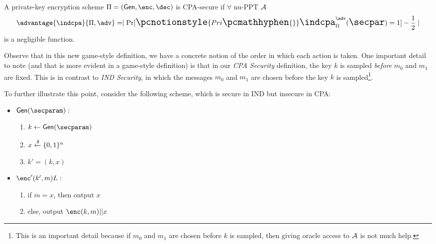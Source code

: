 \begin{definition}
    A private-key encryption scheme $\Pi = (\gen,\enc,\dec)$ is CPA-secure if $\forall$ nu-PPT $\mathcal{A}$
    $$\advantage{\indcpa}{\Pi,\adv} = \Large\mid \Pr[\pcnotionstyle{Pri\pcmathhyphen{}}\indcpa_\Pi^\adv(\secpar) =1] -\frac12\Large\mid$$
    is a negligible function.
\end{definition}
Observe that in this new game-style definition, we have a concrete notion of the order in which each action is taken.
One important detail to note (and that is more evident in a game-style definition) is that in our \textit{CPA Security} definition,
the key $k$ is sampled \textit{before} $m_0$ and $m_1$ are fixed.
This is in contrast to \textit{IND Security}, in which the messages $m_0$ and $m_1$ are chosen before the key $k$ is sampled\footnote{This is an important detail because if $m_0$ and $m_1$ are chosen before $k$ is sampled, then giving oracle access to $\mathcal{A}$ is not much help.}.

To further illustrate this point, consider the following scheme, which is secure in IND but insecure in CPA:
\begin{itemize}
    \item $\gen(\secparam):$
    \begin{enumerate}
        \item $k \leftarrow \gen(\secparam)$
        \item $x \xleftarrow{\$} \{0, 1\}^n$
        \item $k' = (k, x)$
    \end{enumerate}
    \item $\enc'(k', m)L:$
    \begin{enumerate}
        \item if $m = x$, then output $x$
        \item else, output $\enc(k,m)||x$
    \end{enumerate}
\end{itemize}



